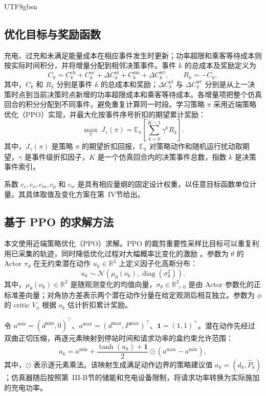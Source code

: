 \documentclass[conference]{IEEEtran}
\begin{document}
\begin{CJK*}{UTF8}{gbsn}
\subsection{优化目标与奖励函数}
充电、过充和未满足能量成本在相应事件发生时更新；功率超限和乘客等待成本则按实际时间积分，并将增量分配到相邻决策事件。事件 $k$ 的总成本及奖励定义为
\begin{equation}
 C_k = C^{\mathrm{ch}}_k + C^{\mathrm{oc}}_k + \Delta C^{\mathrm{ol}}_k
 + C^{\mathrm{em}}_k + \Delta C^{\mathrm{wt}}_k,
 \qquad R_k=-C_k,
\end{equation}
其中，$C_k$ 和 $R_k$ 分别是事件 $k$ 的总成本和奖励；$\Delta C^{\mathrm{ol}}_k$ 与 $\Delta C^{\mathrm{wt}}_k$ 分别是从上一决策时点到当前决策时点新增的功率超限成本和乘客等待成本。各增量项把整个仿真回合的积分分配到不同事件，避免重复计算同一时段。学习策略 $\pi$ 采用近端策略优化（PPO）实现，并最大化按事件序号折扣的期望累计奖励：
\begin{equation}
 \max_{\pi}\ J_{\gamma}(\pi)
 =\mathbb{E}_{\pi}\!\left[\sum_{k=0}^{K-1}\gamma^k R_k\right].
\end{equation}
其中，$J_{\gamma}(\pi)$ 是策略 $\pi$ 的期望折扣回报，$\mathbb{E}_{\pi}$ 对策略动作和随机运行扰动取期望，$\gamma$ 是事件级折扣因子，$K$ 是一个仿真回合内的决策事件总数，指数 $k$ 是决策事件索引。

系数 $c_e,c_o,c_m,c_p$ 和 $c_w$ 是具有相应量纲的固定设计权重，以任意目标函数单位计量。其具体取值及变化方案在第~IV节给出。

\subsection{基于 PPO 的求解方法}
本文使用近端策略优化（PPO）求解。PPO 的裁剪重要性采样比目标可以重复利用已采集的轨迹，同时降低优化过程对大幅概率比变化的激励 \cite{schulman2017ppo}。参数为 $\theta$ 的 Actor $\pi_\theta$ 在无约束潜在动作 $u_k\in\mathbb{R}^2$ 上定义因子化高斯分布：
\begin{equation}
 u_k\sim\mathcal{N}\!\left(\mu_\theta(o_k),
 \operatorname{diag}(\sigma_\theta^2)\right).
\end{equation}
其中，$\mu_\theta(o_k)\in\mathbb{R}^2$ 是随观测变化的均值向量，$\sigma_\theta\in\mathbb{R}_{>0}^2$ 是由 Actor 参数化的正标准差向量；对角协方差表示两个潜在动作分量在给定观测后相互独立。参数为 $\phi$ 的 critic $V_\phi$ 根据 $o_k$ 估计折扣累计奖励。

令 $a^{\min}=(d^{\min},0)^\top$、$a^{\max}=(d^{\max},P^{\max})^\top$、$\mathbf{1}=(1,1)^\top$。潜在动作先经过双曲正切压缩，再逐元素映射到停站时间和请求功率的盒约束允许范围：
\begin{equation}
 a_k=a^{\min}+\frac{\tanh(u_k)+\mathbf{1}}{2}
 \odot(a^{\max}-a^{\min}),
\end{equation}
其中，$\odot$ 表示逐元素乘法。该映射生成满足动作边界的策略建议值 $a_k=(d_k,\widehat{P}_k)$；仿真器随后按照第~III-B节的储能和充电设备限制，将请求功率转换为实际施加的充电功率。


\end{CJK*}
\end{document}
